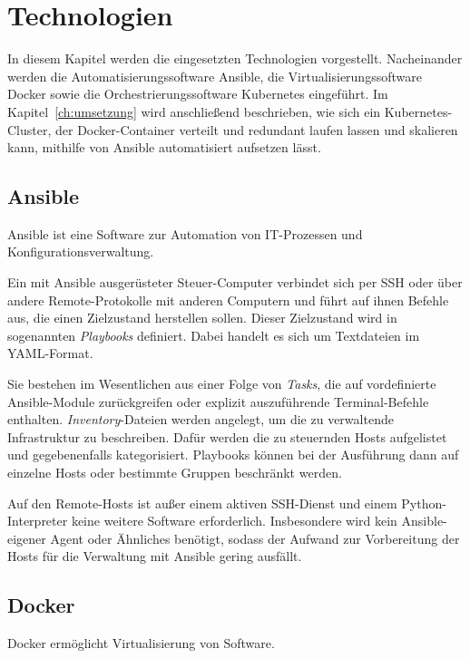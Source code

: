 \chapter{Technologien}\label{ch:technologien}

In diesem Kapitel werden die eingesetzten Technologien vorgestellt.
Nacheinander werden die Automatisierungssoftware Ansible, die Virtualisierungssoftware Docker sowie die Orchestrierungssoftware Kubernetes eingeführt.
Im Kapitel~\ref{ch:umsetzung} wird anschließend beschrieben, wie sich ein Kubernetes-Cluster, der Docker-Container verteilt und redundant laufen lassen und skalieren kann, mithilfe von Ansible automatisiert aufsetzen lässt.

\section{Ansible}\label{sec:ansible}

Ansible ist eine Software zur Automation von IT-Prozessen und Konfigurationsverwaltung.

Ein mit Ansible ausgerüsteter Steuer-Computer verbindet sich per SSH oder über andere Remote-Protokolle mit anderen Computern und führt auf ihnen Befehle aus, die einen Zielzustand herstellen sollen.
Dieser Zielzustand wird in sogenannten \emph{Playbooks} definiert.
Dabei handelt es sich um Textdateien im YAML-Format.

Sie bestehen im Wesentlichen aus einer Folge von \emph{Tasks}, die auf vordefinierte Ansible-Module zurückgreifen oder explizit auszuführende Terminal-Befehle enthalten.
\emph{Inventory}-Dateien werden angelegt, um die zu verwaltende Infrastruktur zu beschreiben.
Dafür werden die zu steuernden Hosts aufgelistet und gegebenenfalls kategorisiert.
Playbooks können bei der Ausführung dann auf einzelne Hosts oder bestimmte Gruppen beschränkt werden.

Auf den Remote-Hosts ist außer einem aktiven SSH-Dienst und einem Python-Interpreter keine weitere Software erforderlich.
Insbesondere wird kein Ansible-eigener Agent oder Ähnliches benötigt, sodass der Aufwand zur Vorbereitung der Hosts für die Verwaltung mit Ansible gering ausfällt.

\section{Docker}\label{sec:docker}

Docker ermöglicht Virtualisierung von Software.

